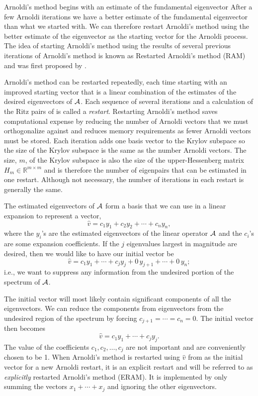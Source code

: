 Arnoldi's method begins with an estimate of the fundamental eigenvector  After a few Arnoldi iterations we have a better estimate of the fundamental eigenvector than what we started with.  We can therefore restart Arnoldi's method using the better estimate of the eigenvector as the starting vector for the Arnoldi process.  The idea of starting Arnoldi's method using the results of several previous iterations of Arnoldi's method is known as Restarted Arnoldi's method (RAM) and was first proposed by \citet{Saad:1980Varia-0}.  

Arnoldi's method can be restarted repeatedly, each time starting with an improved starting vector that is a linear combination of the estimates of the desired eigenvectors of $\mathcal{A}$.  Each sequence of several iterations and a calculation of the Ritz pairs of \A{} is called a \emph{restart}.  Restarting Arnoldi's method saves computational expense by reducing the number of Arnoldi vectors that we must orthogonalize against and reduces memory requirements as fewer Arnoldi vectors must be stored.  Each iteration adds one basis vector to the Krylov subspace so the size of the Krylov subspace is the same as the number Arnoldi vectors.  The size, $m$, of the Krylov subspace is also the size of the upper-Hessenberg matrix \mbox{$H_m \in \mathbb{R}^{m \times m}$} and is therefore the number of eigenpairs that can be estimated in one restart.  Although not necessary, the number of iterations in each restart is generally the same.

The estimated eigenvectors of $\mathcal{A}$ form a basis that we can use in a linear expansion to represent a vector,
\begin{equation}
    \hat{v} = c_1y_1 + c_2y_2 + \cdots + c_ny_n,
\end{equation}
where the $y_i$'s are the estimated eigenvectors of the linear operator $\mathcal{A}$ and the $c_i$'s are some expansion coefficients.  If the $j$ eigenvalues largest in magnitude are desired, then we would like to have our initial vector be
\begin{equation}
    \hat{v} = c_1y_1 + \cdots + c_jy_j + 0\,y_{j+1} + \cdots + 0\,y_n;
\end{equation} 
i.e., we want to suppress any information from the undesired portion of the spectrum of $\mathcal{A}$.

The initial vector will most likely contain significant components of all the eigenvectors.  We can reduce the components from eigenvectors from the undesired region of the spectrum by forcing \mbox{$c_{j+1} = \cdots = c_n = 0$}.  The initial vector then becomes
\begin{equation}
    \hat{v} = c_1y_1 + \cdots + c_jy_j.
    \label{eq:ExplicitRestartVector}
\end{equation} 
The value of the coefficients \mbox{$c_1, c_2, \ldots, c_j$} are not important and are conveniently chosen to be 1.  When Arnoldi's method is restarted using $\hat{v}$ from  as the initial vector for a new Arnoldi restart, it is an explicit restart and will be referred to as \emph{explicitly} restarted Arnoldi's method (ERAM).  It is implemented by only summing the vectors \mbox{$x_1 + \cdots + x_j$} and ignoring the other eigenvectors.

